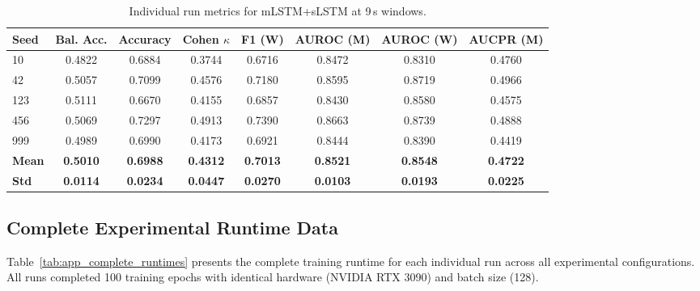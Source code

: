 \begin{table}[htbp]
\centering
\caption{Individual run metrics for mLSTM+sLSTM at 9\,s windows.}
\label{tab:app_metrics_combined_9s}
\footnotesize
\setlength{\tabcolsep}{2.5pt}
\begin{tabular}{l | c | c | c | c | c | c | c}
\textbf{Seed} & \textbf{Bal. Acc.} & \textbf{Accuracy} & \textbf{Cohen \(\kappa\)} & \textbf{F1 (W)} & \textbf{AUROC (M)} & \textbf{AUROC (W)} & \textbf{AUCPR (M)} \\
\hline
10  & 0.4822 & 0.6884 & 0.3744 & 0.6716 & 0.8472 & 0.8310 & 0.4760 \\
42  & 0.5057 & 0.7099 & 0.4576 & 0.7180 & 0.8595 & 0.8719 & 0.4966 \\
123 & 0.5111 & 0.6670 & 0.4155 & 0.6857 & 0.8430 & 0.8580 & 0.4575 \\
456 & 0.5069 & 0.7297 & 0.4913 & 0.7390 & 0.8663 & 0.8739 & 0.4888 \\
999 & 0.4989 & 0.6990 & 0.4173 & 0.6921 & 0.8444 & 0.8390 & 0.4419 \\
\hline
\textbf{Mean} & \textbf{0.5010} & \textbf{0.6988} & \textbf{0.4312} & \textbf{0.7013} & \textbf{0.8521} & \textbf{0.8548} & \textbf{0.4722} \\
\textbf{Std} & \textbf{0.0114} & \textbf{0.0234} & \textbf{0.0447} & \textbf{0.0270} & \textbf{0.0103} & \textbf{0.0193} & \textbf{0.0225} \\
\hline
\end{tabular}
\setlength{\tabcolsep}{6pt}
\end{table}

\newpage

\subsection{Complete Experimental Runtime Data}
\label{app:complete_runtime_data}

Table~\ref{tab:app_complete_runtimes} presents the complete training runtime for each individual run across all experimental configurations. All runs completed 100 training epochs with identical hardware (NVIDIA RTX 3090) and batch size (128).

